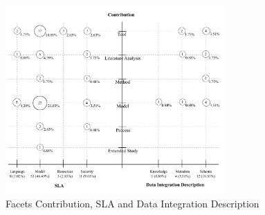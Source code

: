\begin{figure}[ht!]
\centering
\includegraphics[width=0.75\textwidth]{figs/bubble-charts/Contribution-SLA-DIdescription.pdf}
  
\caption{Facets Contribution, SLA and Data Integration Description}\label{fig:facet1}
\end{figure} 



